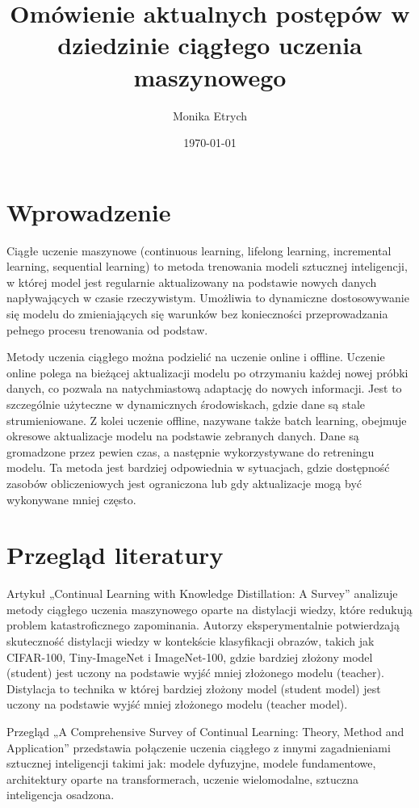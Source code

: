 \documentclass[a4paper,12pt]{article}
\title{Omówienie aktualnych postępów w dziedzinie ciągłego uczenia maszynowego}
\author{Monika Etrych}
\date{\today}
\begin{document}
\maketitle

\section{Wprowadzenie}
Ciągłe uczenie maszynowe (continuous learning, lifelong learning, incremental learning, sequential learning) to metoda trenowania modeli sztucznej inteligencji, w której model jest regularnie aktualizowany na podstawie nowych danych napływających w czasie rzeczywistym. Umożliwia to dynamiczne dostosowywanie się modelu do zmieniających się warunków bez konieczności przeprowadzania pełnego procesu trenowania od podstaw.

Metody uczenia ciągłego można podzielić na uczenie online i offline. Uczenie online polega na bieżącej aktualizacji modelu po otrzymaniu każdej nowej próbki danych, co pozwala na natychmiastową adaptację do nowych informacji. Jest to szczególnie użyteczne w dynamicznych środowiskach, gdzie dane są stale strumieniowane. Z kolei uczenie offline, nazywane także batch learning, obejmuje okresowe aktualizacje modelu na podstawie zebranych danych. Dane są gromadzone przez pewien czas, a następnie wykorzystywane do retreningu modelu. Ta metoda jest bardziej odpowiednia w sytuacjach, gdzie dostępność zasobów obliczeniowych jest ograniczona lub gdy aktualizacje mogą być wykonywane mniej często.

\section{Przegląd literatury}
Artykuł „Continual Learning with Knowledge Distillation: A Survey” analizuje metody ciągłego uczenia maszynowego oparte na distylacji wiedzy, które redukują problem katastroficznego zapominania. Autorzy eksperymentalnie potwierdzają skuteczność distylacji wiedzy w kontekście klasyfikacji obrazów, takich jak CIFAR-100, Tiny-ImageNet i ImageNet-100, gdzie bardziej złożony model (student) jest uczony na podstawie wyjść mniej złożonego modelu (teacher). Distylacja to technika w której bardziej złożony model (student model) jest uczony na podstawie wyjść  mniej złożonego modelu (teacher model).

Przegląd „A Comprehensive Survey of Continual Learning: Theory, Method and Application”  przedstawia połączenie uczenia ciągłego z innymi zagadnieniami sztucznej inteligencji takimi jak: modele dyfuzyjne, modele fundamentowe, architektury oparte na transformerach, uczenie wielomodalne, sztuczna inteligencja osadzona.
\end{document}

